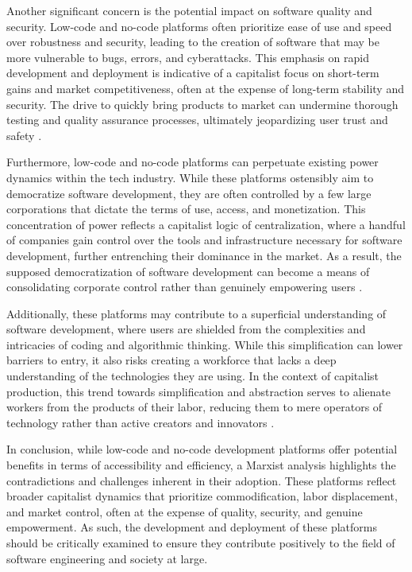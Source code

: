 \begin{refsection}
Another significant concern is the potential impact on software quality and security. Low-code and no-code platforms often prioritize ease of use and speed over robustness and security, leading to the creation of software that may be more vulnerable to bugs, errors, and cyberattacks. This emphasis on rapid development and deployment is indicative of a capitalist focus on short-term gains and market competitiveness, often at the expense of long-term stability and security. The drive to quickly bring products to market can undermine thorough testing and quality assurance processes, ultimately jeopardizing user trust and safety \cite[pp.~150-153]{russell2021human}.

Furthermore, low-code and no-code platforms can perpetuate existing power dynamics within the tech industry. While these platforms ostensibly aim to democratize software development, they are often controlled by a few large corporations that dictate the terms of use, access, and monetization. This concentration of power reflects a capitalist logic of centralization, where a handful of companies gain control over the tools and infrastructure necessary for software development, further entrenching their dominance in the market. As a result, the supposed democratization of software development can become a means of consolidating corporate control rather than genuinely empowering users \cite[pp.~60-63]{schiller2000digital}.

Additionally, these platforms may contribute to a superficial understanding of software development, where users are shielded from the complexities and intricacies of coding and algorithmic thinking. While this simplification can lower barriers to entry, it also risks creating a workforce that lacks a deep understanding of the technologies they are using. In the context of capitalist production, this trend towards simplification and abstraction serves to alienate workers from the products of their labor, reducing them to mere operators of technology rather than active creators and innovators \cite[pp.~184-187]{braverman1998labor}.

In conclusion, while low-code and no-code development platforms offer potential benefits in terms of accessibility and efficiency, a Marxist analysis highlights the contradictions and challenges inherent in their adoption. These platforms reflect broader capitalist dynamics that prioritize commodification, labor displacement, and market control, often at the expense of quality, security, and genuine empowerment. As such, the development and deployment of these platforms should be critically examined to ensure they contribute positively to the field of software engineering and society at large.


\end{refsection}
